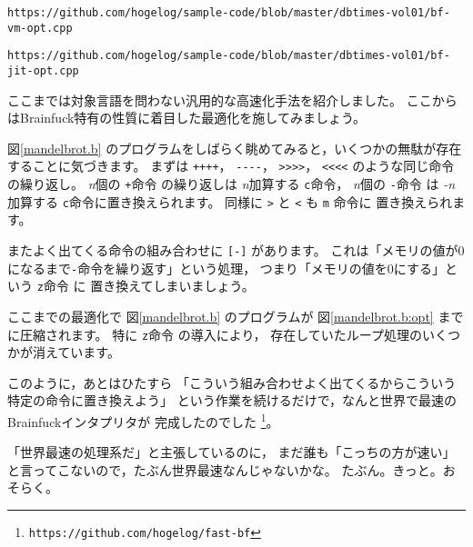 {\scriptsize
\verb|https://github.com/hogelog/sample-code/blob/master/dbtimes-vol01/bf-vm-opt.cpp|
}

{\scriptsize
\verb|https://github.com/hogelog/sample-code/blob/master/dbtimes-vol01/bf-jit-opt.cpp|
}

ここまでは対象言語を問わない汎用的な高速化手法を紹介しました。
ここからはBrainfuck特有の性質に着目した最適化を施してみましょう。

図\ref{mandelbrot.b}
のプログラムをしばらく眺めてみると，いくつかの無駄が存在することに気づきます。
まずは
\verb|++++|，
\verb|----|，
\verb|>>>>|，
\verb|<<<<|
のような同じ命令の繰り返し。
{\it n}個の
\verb|+|命令
の繰り返しは
{\it n}加算する
\verb|c|命令，
{\it n}個の
\verb|-|命令
は
{\it -n}加算する
\verb|c|命令に置き換えられます。
同様に
\verb|>|
と
\verb|<|
も
\verb|m|
命令に
置き換えられます。

またよく出てくる命令の組み合わせに
\verb|[-]|
があります。
これは「メモリの値が0になるまで\verb|-|命令を繰り返す」という処理，
つまり「メモリの値を0にする」という
\verb|z|命令
に
置き換えてしまいましょう。

ここまでの最適化で
図\ref{mandelbrot.b}
のプログラムが
図\ref{mandelbrot.b:opt}
までに圧縮されます。
特に
\verb|z|命令
の導入により，
存在していたループ処理のいくつかが消えています。

このように，あとはひたすら
「こういう組み合わせよく出てくるからこういう特定の命令に置き換えよう」
という作業を続けるだけで，なんと世界で最速のBrainfuckインタプリタが
完成したのでした
\footnote{
\verb|https://github.com/hogelog/fast-bf|
}。

「世界最速の処理系だ」と主張しているのに，
まだ誰も「こっちの方が速い」
と言ってこないので，たぶん世界最速なんじゃないかな。
たぶん。きっと。おそらく。
